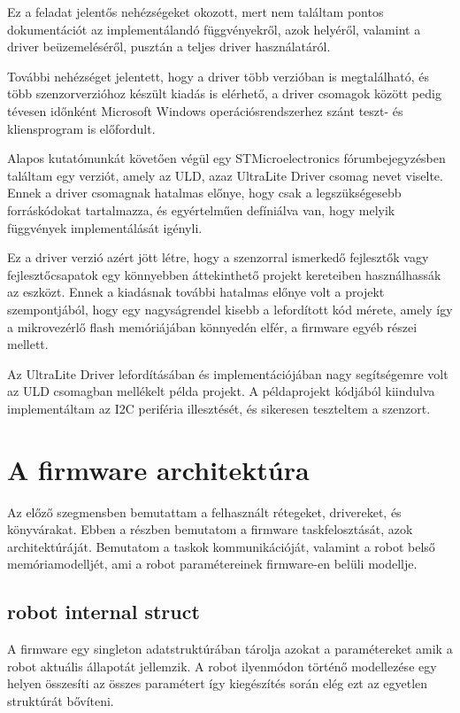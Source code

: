 Ez a feladat jelentős nehézségeket okozott, mert nem találtam pontos
dokumentációt az implementálandó függvényekről, azok helyéről, valamint a driver
beüzemeléséről, pusztán a teljes driver használatáról.

További nehézséget jelentett, hogy a driver több verzióban is megtalálható, és
több szenzorverzióhoz készült kiadás is elérhető, a driver csomagok között pedig
tévesen időnként Microsoft Windows operációsrendszerhez szánt teszt- és
kliensprogram is előfordult.

\medskip

Alapos kutatómunkát követően végül egy STMicroelectronics fórumbejegyzésben
találtam egy verziót, amely az ULD, azaz UltraLite Driver csomag nevet
viselte. Ennek a driver csomagnak hatalmas előnye, hogy csak a legszükségesebb
forráskódokat tartalmazza, és egyértelműen defíniálva van, hogy melyik függvények
implementálását igényli.

Ez a driver verzió azért jött létre, hogy a szenzorral ismerkedő fejlesztők vagy
fejlesztőcsapatok egy könnyebben áttekinthető projekt kereteiben használhassák az
eszközt. Ennek a kiadásnak további hatalmas előnye volt a projekt szempontjából,
hogy egy nagyságrendel kisebb a lefordított kód mérete, amely így a mikrovezérlő
flash memóriájában könnyedén elfér, a firmware egyéb részei mellett.

Az UltraLite Driver lefordításában és implementációjában nagy segítségemre volt
az ULD csomagban mellékelt példa projekt. A példaprojekt kódjából kiindulva
implementáltam az I2C periféria illesztését, és sikeresen teszteltem a szenzort.

\section{A firmware architektúra}

Az előző szegmensben bemutattam a felhasznált rétegeket, drivereket, és
könyvárakat. Ebben a részben bemutatom a firmware taskfelosztását, azok
architektúráját. Bemutatom a taskok kommunikációját, valamint a robot belső
memóriamodelljét, ami a robot paramétereinek firmware-en belüli modellje. 

\subsection{robot internal struct}

A firmware egy singleton adatstruktúrában tárolja azokat a paramétereket amik a
robot aktuális állapotát jellemzik. A robot ilyenmódon történő modellezése egy
helyen összesíti az összes paramétert így kiegészítés során elég ezt az egyetlen
struktúrát bővíteni.

